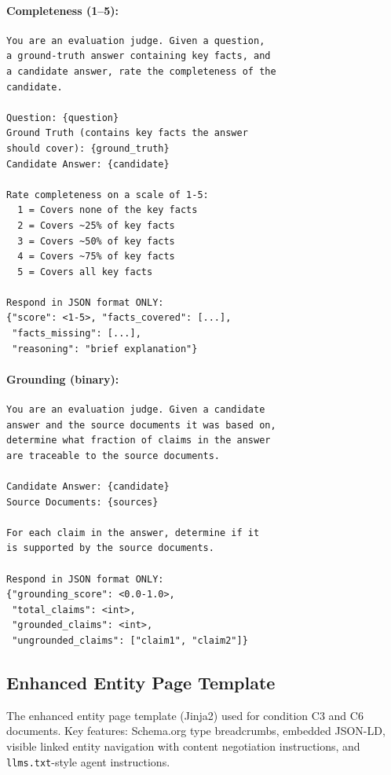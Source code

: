 \documentclass[runningheads]{llncs}
\begin{document}
\paragraph{Completeness (1--5):}
\begin{lstlisting}[basicstyle=\small\ttfamily,breaklines=true,frame=single]
You are an evaluation judge. Given a question,
a ground-truth answer containing key facts, and
a candidate answer, rate the completeness of the
candidate.

Question: {question}
Ground Truth (contains key facts the answer
should cover): {ground_truth}
Candidate Answer: {candidate}

Rate completeness on a scale of 1-5:
  1 = Covers none of the key facts
  2 = Covers ~25% of key facts
  3 = Covers ~50% of key facts
  4 = Covers ~75% of key facts
  5 = Covers all key facts

Respond in JSON format ONLY:
{"score": <1-5>, "facts_covered": [...],
 "facts_missing": [...],
 "reasoning": "brief explanation"}
\end{lstlisting}

\paragraph{Grounding (binary):}
\begin{lstlisting}[basicstyle=\small\ttfamily,breaklines=true,frame=single]
You are an evaluation judge. Given a candidate
answer and the source documents it was based on,
determine what fraction of claims in the answer
are traceable to the source documents.

Candidate Answer: {candidate}
Source Documents: {sources}

For each claim in the answer, determine if it
is supported by the source documents.

Respond in JSON format ONLY:
{"grounding_score": <0.0-1.0>,
 "total_claims": <int>,
 "grounded_claims": <int>,
 "ungrounded_claims": ["claim1", "claim2"]}
\end{lstlisting}

\subsection{Enhanced Entity Page Template}

The enhanced entity page template (Jinja2) used for condition C3 and C6
documents. Key features: Schema.org type breadcrumbs, embedded JSON-LD,
visible linked entity navigation with content negotiation instructions,
and \texttt{llms.txt}-style agent instructions.
\end{document}
